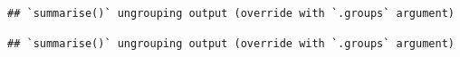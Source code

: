 \documentclass[
]{article}
\newenvironment{Shaded}{\begin{snugshade}}{\end{snugshade}}
\newcommand{\DataTypeTok}[1]{\textcolor[rgb]{0.13,0.29,0.53}{#1}}
\newcommand{\KeywordTok}[1]{\textcolor[rgb]{0.13,0.29,0.53}{\textbf{#1}}}
\newcommand{\NormalTok}[1]{#1}
\newcommand{\OperatorTok}[1]{\textcolor[rgb]{0.81,0.36,0.00}{\textbf{#1}}}
\newcommand{\StringTok}[1]{\textcolor[rgb]{0.31,0.60,0.02}{#1}}
\begin{document}
\begin{verbatim}
## `summarise()` ungrouping output (override with `.groups` argument)
\end{verbatim}

\begin{Shaded}
\end{Shaded}

\begin{verbatim}
## `summarise()` ungrouping output (override with `.groups` argument)
\end{verbatim}
\end{document}
